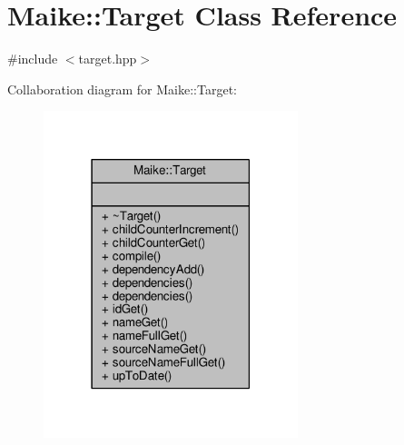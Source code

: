 \hypertarget{class_maike_1_1_target}{}\section{Maike\+:\+:Target Class Reference}
\label{class_maike_1_1_target}


{\ttfamily \#include $<$target.\+hpp$>$}



Collaboration diagram for Maike\+:\+:Target\+:\nopagebreak
\begin{figure}[H]
\begin{center}
\leavevmode
\includegraphics[width=210pt]{class_maike_1_1_target__coll__graph}
\end{center}
\end{figure}
